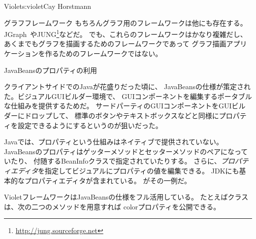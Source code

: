 \begin{aosachapter}{Violet}{s:violet}{Cay Horstmann}
\begin{aosasect1}{グラフフレームワーク}
もちろんグラフ用のフレームワークは他にも存在する。
JGraph~\cite{bib:alder:jgraph}やJUNG\footnote{\url{http://jung.sourceforge.net}}などだ。
でも、これらのフレームワークはかなり複雑だし、あくまでもグラフを描画するためのフレームワークであって
グラフ描画アプリケーションを作るためのフレームワークではない。

\end{aosasect1}

\begin{aosasect1}{JavaBeansのプロパティの利用}

クライアントサイドでのJavaが花盛りだった頃に、
JavaBeansの仕様が策定された。ビジュアルGUIビルダー環境で、
GUIコンポーネントを編集するポータブルな仕組みを提供するためだ。
サードパーティのGUIコンポーネントをGUIビルダーにドロップして、
標準のボタンやテキストボックスなどと同様にプロパティを設定できるようにするというのが狙いだった。

Javaでは、プロパティという仕組みはネイティブで提供されていない。
JavaBeansのプロパティはゲッターメソッドとセッターメソッドのペアになっていたり、
付随するBeanInfoクラスで指定されていたりする。
さらに、\emph{プロパティエディタ}を指定してビジュアルにプロパティの値を編集できる。
JDKにも基本的なプロパティエディタが含まれている。
がその一例だ。

VioletフレームワークはJavaBeansの仕様をフル活用している。
たとえばクラスは、次の二つのメソッドを用意すれば
colorプロパティを公開できる。


\end{aosasect1}
\end{aosachapter}
